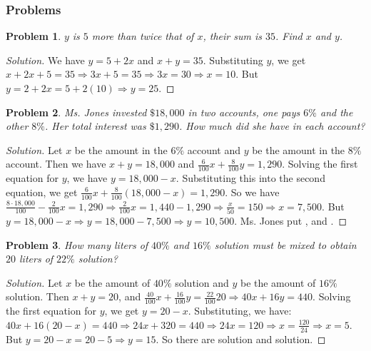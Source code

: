 \documentclass{article}
\theoremstyle{mystyle}
\newtheorem{problem}{Problem}[section]
\begin{document}
\subsubsection{Problems}
\begin{problem}
$y$ is $5$ more than twice that of $x$, their sum is $35$. Find $x$ and $y$.
\end{problem}
\begin{proof}[Solution]
We have $y = 5+2x$ and $x+y = 35$. Substituting $y$, we get $x+2x+5 = 35\Rightarrow 3x+5 = 35\Rightarrow 3x = 30 \Rightarrow \boxed{x = 10}$. But $y = 2+2x = 5+2(10) \Rightarrow \boxed{y= 25}$.
\end{proof}
\begin{problem}
Ms. Jones invested $\$18,\!000$ in two accounts, one pays $6\%$ and the other $8\%$. Her total interest was $\$1,\!290$. How much did she have in each account?
\end{problem}
\begin{proof}[Solution]
Let $x$ be the amount in the $6\%$ account and $y$ be the amount in the $8\%$ account. Then we have $x+y = 18,\!000$ and $\frac{6}{100}x + \frac{8}{100}y = 1,\!290$. Solving the first equation for $y$, we have $y= 18,\!000 - x$. Substituting this into the second equation, we get $\frac{6}{100}x + \frac{8}{100}(18,\!000 - x) = 1,\!290$. So we have $\frac{8 \cdot 18,000}{100} - \frac{2}{100}x = 1,\!290 \Rightarrow \frac{2}{100}x = 1,\!440 - 1,\!290 \Rightarrow \frac{x}{50} = 150 \Rightarrow \boxed{x = 7,\!500}$. But $y = 18,\!000 - x \Rightarrow y= 18,\!000 - 7,\!500 \Rightarrow \boxed{y = 10,\!500}$. Ms. Jones put , and .
\end{proof}
\begin{problem}
How many liters of $40\%$ and $16\%$ solution must be mixed to obtain $20$ liters of $22\%$ solution?
\end{problem}
\begin{proof}[Solution]
Let $x$ be the amount of $40\%$ solution and $y$ be the amount of $16\%$ solution. Then $x+y = 20$, and $\frac{40}{100}x +\frac{16}{100}y = \frac{22}{100}20\Rightarrow 40x+16y = 440$. Solving the first equation for $y$, we get $y = 20 - x$. Substituting, we have: $40x + 16(20-x) = 440\Rightarrow 24x + 320 = 440 \Rightarrow 24x = 120\Rightarrow x=\frac{120}{24}\Rightarrow \boxed{x = 5}$. But $y = 20 - x = 20 - 5 \Rightarrow \boxed{y = 15}$. So there are  solution and  solution.
\end{proof}
\end{document}
